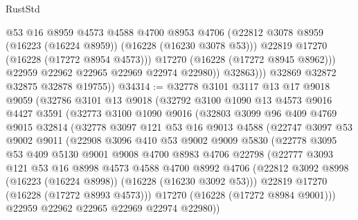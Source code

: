 \begin{lexlean}{RustStd}
\begin{coremodule}
                      @53
                      @16
                      @8959
                      @4573
                      @4588
                      @4700
                      @8953
                      @4706
                      (@22812 @3078 @8959 (@16223 (@16224 @8959)) (@16228 (@16230 @3078 @53)))
                      @22819
                      @17270
                      (@16228 (@17272 @8954 @4573)))
                    @17270
                    (@16228 (@17272 @8945 @8962)))
                  @22959
                  @22962
                  @22965
                  @22969
                  @22974
                  @22980))
              @32863)))
        @32869
        @32872
        @32875
        @32878
        @19755))
@34314 := @32778
    @3101
    @3117
    @13
    @17
    @9018
    @9059
    (@32786
      @3101
      @13
      @9018
      (@32792
        @3100
        @1090
        @13
        @4573
        @9016
        @4427
        @3591
        (@32773
          @3100
          @1090
          @9016
          (@32803
            @3099
            @96
            @409
            @4769
            @9015
            @32814
            (@32778
              @3097
              @121
              @53
              @16
              @9013
              @4588
              (@22747
                @3097
                @53
                @9002
                @9011
                (@22908
                  @3096
                  @410
                  @53
                  @9002
                  @9009
                  @5830
                  (@22778
                    @3095
                    @53
                    @409
                    @5130
                    @9001
                    @9008
                    @4700
                    @8983
                    @4706
                    @22798
                    (@22777
                      @3093
                      @121
                      @53
                      @16
                      @8998
                      @4573
                      @4588
                      @4700
                      @8992
                      @4706
                      (@22812 @3092 @8998 (@16223 (@16224 @8998)) (@16228 (@16230 @3092 @53)))
                      @22819
                      @17270
                      (@16228 (@17272 @8993 @4573)))
                    @17270
                    (@16228 (@17272 @8984 @9001)))
                  @22959
                  @22962
                  @22965
                  @22969
                  @22974
                  @22980))

\end{coremodule}
\end{lexlean}
